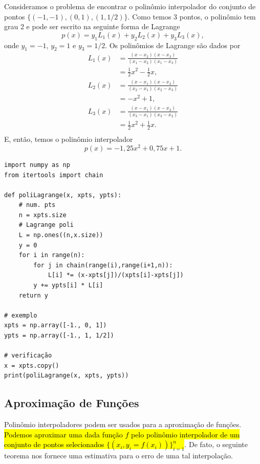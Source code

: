 \begin{ex}
  Consideramos o problema de encontrar o polinômio interpolador do conjunto de pontos $\{(-1, -1), (0, 1), (1, 1/2)\}$. Como temos 3 pontos, o polinômio tem grau 2 e pode ser escrito na seguinte forma de Lagrange
  \begin{equation}
    p(x) = y_1L_1(x) + y_2L_2(x) + y_3L_3(x),
  \end{equation}
  onde $y_1 = -1$, $y_2 = 1$ e $y_3 = 1/2$. Os polinômios de Lagrange são dados por
  \begin{align}
    L_1(x) &= \frac{(x-x_2)(x-x_3)}{(x_1-x_2)(x_1-x_3)} \\
           &= \frac{1}{2}x^2 - \frac{1}{2}x,\\
    L_2(x) &= \frac{(x-x_1)(x-x_3)}{(x_2-x_1)(x_2-x_3)} \\
           &= -x^2 + 1,\\
    L_3(x) &= \frac{(x-x_1)(x-x_2)}{(x_3-x_1)(x_3-x_2)} \\
           &= \frac{1}{2}x^2 + \frac{1}{2}x.\\
  \end{align}
  E, então, temos o polinômio interpolador
  \begin{equation}
    p(x) = -1,25x^2 + 0,75x + 1.
  \end{equation}

\begin{lstlisting}[caption=poliLagrange.py]
import numpy as np
from itertools import chain

def poliLagrange(x, xpts, ypts):
    # num. pts
    n = xpts.size
    # Lagrange poli
    L = np.ones((n,x.size))
    y = 0
    for i in range(n):
        for j in chain(range(i),range(i+1,n)):
            L[i] *= (x-xpts[j])/(xpts[i]-xpts[j])
        y += ypts[i] * L[i]
    return y

# exemplo
xpts = np.array([-1., 0, 1])
ypts = np.array([-1., 1, 1/2])

# verificação
x = xpts.copy()
print(poliLagrange(x, xpts, ypts))
\end{lstlisting}
\end{ex}

\subsection{Aproximação de Funções}

Polinômio interpoladores podem ser usados para a aproximação de funções. \hl{Podemos aproximar uma dada função $f$ pelo polinômio interpolador de um conjunto de pontos selecionados $\{(x_i, y_i=f(x_i))\}_{i=1}^n$}. De fato, o seguinte teorema nos fornece uma estimativa para o erro de uma tal interpolação.

